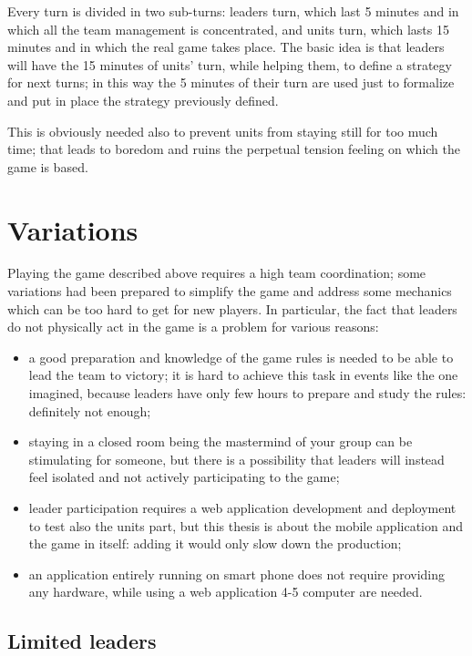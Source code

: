 			Every turn is divided in two sub-turns: leaders turn, which last 5 minutes and in which all the team management is concentrated, and units turn, which lasts 15 minutes and in which the real game takes place.
			The basic idea is that leaders will have the 15 minutes of units' turn, while helping them, to define a strategy for next turns; in this way the 5 minutes of their turn are used just to formalize and put in place the strategy previously defined.
			
			This is obviously needed also to prevent units from staying still for too much time; that leads to boredom and ruins the perpetual tension feeling on which the game is based.
			
	\section{Variations}
		
		Playing the game described above requires a high team coordination; some variations had been prepared to simplify the game and address some mechanics which can be too hard to get for new players.
		In particular, the fact that leaders do not physically act in the game is a problem for various reasons:
		
		\begin{itemize}
			\item a good preparation and knowledge of the game rules is needed to be able to lead the team to victory; it is hard to achieve this task in events like the one imagined, because leaders have only few hours to prepare and study the rules: definitely not enough;
			\item staying in a closed room being the mastermind of your group can be stimulating for someone, but there is a possibility that leaders will instead feel isolated and not actively participating to the game;
			\item leader participation requires a web application development and deployment to test also the units part, but this thesis is about the mobile application and the game in itself: adding it would only slow down the production;
			\item an application entirely running on smart phone does not require providing any hardware, while using a web application 4-5 computer are needed.
		\end{itemize}
		
		\subsection{Limited leaders}
		
